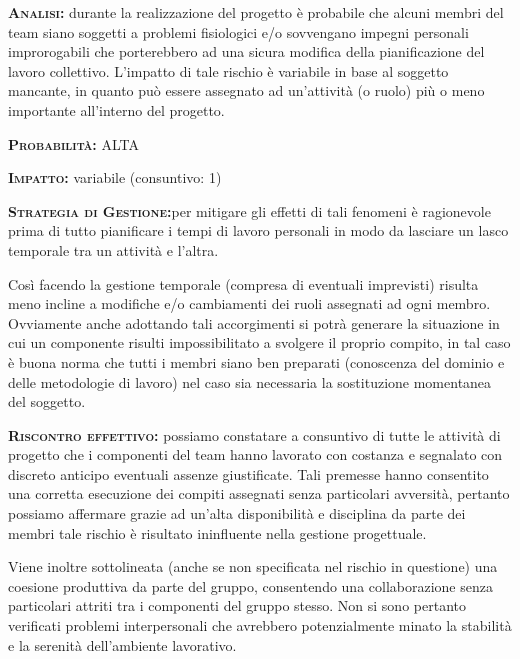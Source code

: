 \begin{description}
	\item{\scshape\bfseries Analisi:} durante la realizzazione del progetto è probabile che alcuni membri del team siano soggetti a problemi fisiologici e/o sovvengano impegni personali improrogabili che porterebbero ad una sicura modifica della pianificazione del lavoro collettivo. L'impatto di tale rischio è variabile in base al soggetto mancante, in quanto può essere assegnato ad un'attività (o ruolo) più o meno importante all'interno del progetto.
	\item{\scshape\bfseries Probabilità:} ALTA 
	\item{\scshape\bfseries Impatto:} variabile (consuntivo: 1)
	\item{\scshape\bfseries Strategia di Gestione:}per mitigare gli effetti di tali fenomeni è ragionevole prima di tutto pianificare i tempi di lavoro personali in modo da lasciare un lasco temporale tra un attività e l'altra.
	
Così facendo la gestione temporale (compresa di eventuali imprevisti) risulta meno incline a modifiche e/o cambiamenti dei ruoli assegnati ad ogni membro. Ovviamente anche adottando tali accorgimenti si potrà generare la situazione in cui un componente risulti impossibilitato a svolgere il proprio compito, in tal caso è buona norma che tutti i membri siano ben preparati (conoscenza del dominio e delle metodologie di lavoro) nel caso sia necessaria la sostituzione momentanea del soggetto.

	\item{\scshape\bfseries Riscontro effettivo:} possiamo constatare a consuntivo di tutte le attività di progetto che i componenti del team hanno lavorato con costanza e segnalato con discreto anticipo eventuali assenze giustificate. Tali premesse hanno consentito una corretta esecuzione dei compiti assegnati senza particolari avversità, pertanto possiamo affermare grazie ad un'alta disponibilità e disciplina da parte dei membri tale rischio è risultato ininfluente nella gestione progettuale.

Viene inoltre sottolineata (anche se non specificata nel rischio in questione) una coesione produttiva da parte del gruppo, consentendo una collaborazione senza particolari attriti tra i componenti del gruppo stesso. Non si sono pertanto verificati problemi interpersonali che avrebbero potenzialmente minato la stabilità e la serenità dell'ambiente lavorativo. 

\end{description}

